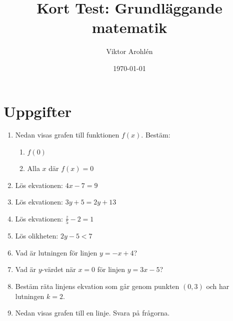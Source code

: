 \documentclass[a4paper,11pt]{article}
\title{Kort Test: Grundläggande matematik}
\author{Viktor Arohlén}
\date{\today}
\begin{document}
\maketitle

\section*{Uppgifter}
\begin{enumerate}[label=\textbf{\arabic*.}]
    \item Nedan visas grafen till funktionen $f(x)$. Bestäm:
    \begin{enumerate}[label=\alph*)]
        \item $f(0)$
        \item Alla $x$ där $f(x) = 0$
    \end{enumerate}
    \begin{center}
    \end{center}
    \item Lös ekvationen: $4x - 7 = 9$
    \item Lös ekvationen: $3y + 5 = 2y + 13$
    \item Lös ekvationen: $\frac{z}{5} - 2 = 1$
    \item Lös olikheten: $2y - 5 < 7$
    \item Vad är lutningen för linjen $y = -x + 4$?
    \item Vad är $y$-värdet när $x = 0$ för linjen $y = 3x - 5$?
    \item Bestäm räta linjens ekvation som går genom punkten $(0,3)$ och har lutningen $k=2$.
    \newpage
    \item Nedan visas grafen till en linje. Svara på frågorna.
    \begin{center}
\end{center}
\end{enumerate}
\end{document}
